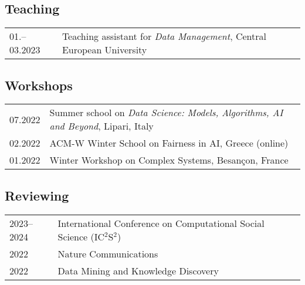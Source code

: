 \subsection*{Teaching}
\begin{longtable}[l]{@{}p{} p{}}
01.–03.2023 & Teaching assistant for \emph{Data Management}, Central European University\\
\end{longtable}


\subsection*{Workshops}
\begin{longtable}[l]{@{}p{} p{}}
    07.2022     & Summer school on \emph{Data Science: Models, Algorithms, AI and Beyond}, Lipari, Italy\\
    02.2022     & ACM-W Winter School on Fairness in AI, Greece (online)\\
    01.2022	    & Winter Workshop on Complex Systems, Besançon, France\\
\end{longtable}

\subsection*{Reviewing}
%
\begin{longtable}[l]{@{}p{} p{}}
    2023--2024 & International Conference on Computational Social Science (IC$^2$S$^2$) \\
    2022 & Nature Communications\\
    2022 & Data Mining and Knowledge Discovery\\
\end{longtable}


